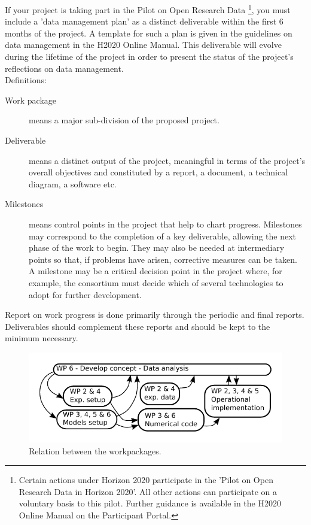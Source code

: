 {%
If your project is taking part in the Pilot on Open Research Data%
\footnote{%
  Certain actions under Horizon 2020 participate in the 'Pilot on Open Research
  Data in Horizon 2020'. All other actions can participate on a voluntary basis
  to this pilot. Further guidance is available in the H2020 Online Manual on the
  Participant Portal.},
you must include a 'data management plan' as a distinct deliverable within the
first 6 months of the project. A template for such a plan is given in the
guidelines on data management in the H2020 Online Manual. This deliverable will
evolve during the lifetime of the project in order to present the status of the
project's reflections on data management.\\
%
Definitions:
\begin{description}
\item[Work package] means a major sub-division of the proposed project.
\item[Deliverable] means a distinct output of the project, meaningful in terms of the project's overall
  objectives and constituted by a report, a document, a technical diagram, a software etc.
\item[Milestones] means control points in the project that help to chart progress. Milestones
    may correspond to the completion of a key deliverable, allowing the next phase of the
    work to begin. They may also be needed at intermediary points so that, if problems have
    arisen, corrective measures can be taken. A milestone may be a critical decision point in
    the project where, for example, the consortium must decide which of several technologies
    to adopt for further development.
\end{description}
%
Report on work progress is done primarily through the periodic and final reports. Deliverables
should complement these reports and should be kept to the minimum necessary.
}
\begin{figure}[h!]
\centering
\includegraphics{WP_schematic}
\caption{Relation between the workpackages.}
\label{fig:WP}
\end{figure}

